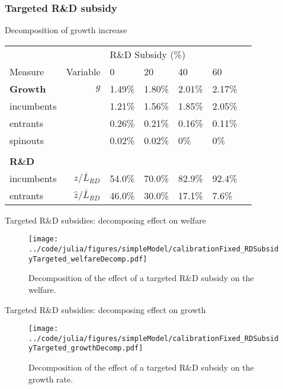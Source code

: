 \documentclass[english,usenames,dvipsnames]{beamer}
\begin{document}
\subsubsection{Targeted R\&D subsidy}

\begin{frame}{Decomposition of growth increase}\label{oi_rd_subsidies:decomposition_growth_decrease}
	\hyperlink{OI_RDsubsidy_table}{}
	\begin{table}
		\centering
		\small
		\begin{tabular}{lrlllll}
			\toprule \toprule
			&  & \multicolumn{4}{l}{R\&D Subsidy (\%)} \vspace{3pt} \tabularnewline
			Measure & Variable & 0 & 20 & 40 & 60 \tabularnewline
			\midrule
			\textbf{Growth} & $g$ & 1.49\% & 1.80\% & 2.01\% & 2.17\% \tabularnewline
			\multicolumn{1}{l}{\quad incumbents} & & 1.21\% & 1.56\% & 1.85\% & 2.05\% \tabularnewline
			\multicolumn{1}{l}{\quad entrants} & & 0.26\% & 0.21\% & 0.16\% & 0.11\% \tabularnewline
			\multicolumn{1}{l}{\quad spinouts} &  & 0.02\% & 0.02\% & 0\% & 0\% \tabularnewline
			\tabularnewline
			\textbf{R\&D} & &  &  &  & \tabularnewline
			\multicolumn{1}{l}{\quad incumbents} & $z / \bar{L}_{RD}$ & 54.0\% & 70.0\% & 82.9\% & 92.4\% \tabularnewline
			\multicolumn{1}{l}{\quad entrants} & $\hat{z} / \bar{L}_{RD}$ & 46.0\% & 30.0\% & 17.1\% & 7.6\% \tabularnewline
			\bottomrule
		\end{tabular}
	\end{table}
\end{frame}

\begin{frame}{Targeted R\&D subsidies: decomposing effect on welfare} \label{plots:oi_rd_subsidies1} 
	\hyperlink{OI_RDsubsidy_table}{}
	\begin{figure}[]
		\texttt{[image: ../code/julia/figures/simpleModel/calibrationFixed\_RDSubsidyTargeted\_welfareDecomp.pdf]}
		\caption{Decomposition of the effect of a targeted R\&D subsidy on the welfare.}
		\label{calibration_OI_RDSubsidy_welfareDecomp}
	\end{figure}
\end{frame}

\begin{frame}{Targeted R\&D subsidies: decomposing effect on growth} \label{plots:oi_rd_subsidies2}
	\hyperlink{OI_RDsubsidy_table}{}
	\begin{figure}[]
		\texttt{[image: ../code/julia/figures/simpleModel/calibrationFixed\_RDSubsidyTargeted\_growthDecomp.pdf]}
		\caption{Decomposition of the effect of a targeted R\&D subsidy on the growth rate.}
		\label{calibration_OI_RDSubsidy_growthDecomp}
	\end{figure}
\end{frame}
\end{document}
